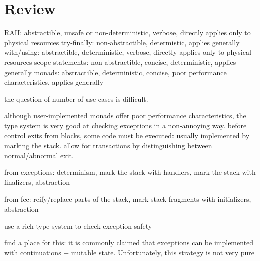\documentclass[11pt]{article}
\newcommand{\maybePage}{\newpage}
\begin{document}
\maybePage
\section{Review}
\label{sec:review}





RAII: abstractible, unsafe or non-deterministic, verbose, directly applies only to physical resources
try-finally: non-abstractible, determistic, applies generally
with/using: abstractible, deterministic, verbose, directly applies only to physical resources
scope statements: non-abstractible, concise, deterministic, applies generally
monads: abstractible, deterministic, concise, poor performance characteristics, applies generally

the question of number of use-cases is difficult.

although user-implemented monads offer poor performance characteristics, the type system is very good at checking exceptions in a non-annoying way.
before control exits from blocks, some code must be executed: usually implemented by marking the stack.
allow for transactions by distinguishing between normal/abnormal exit.



from exceptions: determinism, mark the stack with handlers, mark the stack with finalizers, abstraction

from fcc: reify/replace parts of the stack, mark stack fragments with initializers, abstraction

use a rich type system to check exception safety

find a place for this: it is commonly claimed that exceptions can be implemented with continuations + mutable state. Unfortunately, this strategy is not very pure
\end{document}
